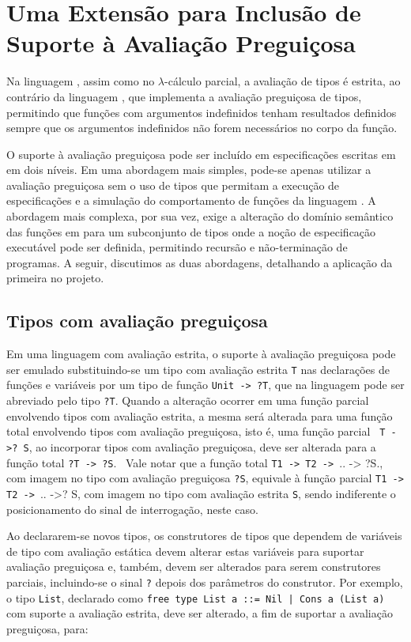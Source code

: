 \chapter{Uma Extensão para Inclusão de Suporte à Avaliação Preguiçosa}
\label{chap:laziness}

Na linguagem \HasCASL, assim como no $\lambda$-cálculo parcial, a avaliação de tipos é estrita, ao contrário da linguagem \Haskell, que implementa a avaliação preguiçosa de tipos, permitindo que funções com argumentos indefinidos tenham resultados definidos sempre que os argumentos indefinidos não forem necessários no corpo da função.

O suporte à avaliação preguiçosa pode ser incluído em especificações escritas em \HasCASL em dois níveis.
Em uma abordagem mais simples, pode-se apenas utilizar a avaliação preguiçosa sem o uso de tipos que permitam a execução de especificações e a simulação do comportamento de funções da linguagem \Haskell.
A abordagem mais complexa, por sua vez, exige a alteração do domínio semântico das funções em \HasCASL para um subconjunto de tipos onde a noção de especificação executável pode ser definida, permitindo recursão e não-terminação de programas.
A seguir, discutimos as duas abordagens, detalhando a aplicação da primeira no projeto.

\section{Tipos com avaliação preguiçosa}
Em uma linguagem com avaliação estrita, o suporte à avaliação preguiçosa pode ser emulado substituindo-se um tipo com avaliação estrita \Verb.T. nas declarações de funções e variáveis por um tipo de função \Verb.Unit -> ?T., que na linguagem \HasCASL pode ser abreviado pelo tipo \Verb.?T..
Quando a alteração ocorrer em uma função parcial envolvendo tipos com avaliação estrita, a mesma será alterada para uma função total envolvendo tipos com avaliação preguiçosa, isto é, uma função parcial \Verb. T ->? S., ao incorporar tipos com avaliação preguiçosa, deve ser alterada para a função total \Verb.?T -> ?S..~\cite{SchroderMossakowski08}
Vale notar que a função total \Verb.T1 -> T2 -> ... -> ?S., com imagem no tipo com avaliação preguiçosa \Verb.?S., equivale à função parcial \Verb.T1 -> T2 -> ... ->? S, com imagem no tipo com avaliação estrita \Verb.S., sendo indiferente o posicionamento do sinal de interrogação, neste caso.

Ao declararem-se novos tipos, os construtores de tipos que dependem de variáveis de tipo com avaliação estática devem alterar estas variáveis para suportar avaliação preguiçosa e, também, devem ser alterados para serem construtores parciais, incluindo-se o sinal \Verb.?. depois dos parâmetros do construtor.
Por exemplo, o tipo \Verb.List., declarado como \Verb.free type List a ::= Nil | Cons a (List a). com suporte a avaliação estrita, deve ser alterado, a fim de suportar a avaliação preguiçosa, para:


